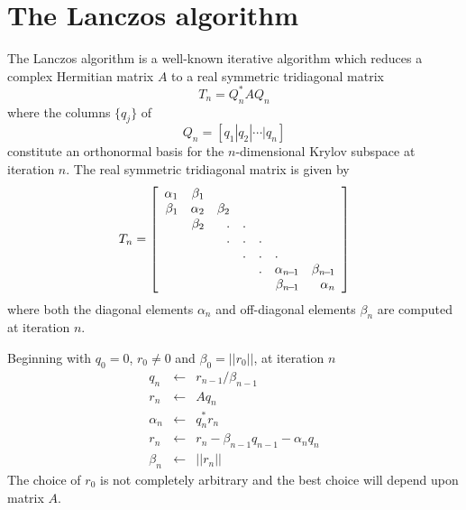 \documentclass[twoside,12pt]{article}
\begin{document}
\section{The Lanczos algorithm}\label{sec:alg}
The Lanczos algorithm is a well-known iterative algorithm
which reduces a complex Hermitian matrix $A$
to a real symmetric tridiagonal matrix
\begin{equation}\label{basic_lancz}
T_{n} = Q_{n}^{*}AQ_{n}
\end{equation}
where the columns $\{q_{j}\}$ of
\begin{equation}
Q_{n} = \left[q_{1}|q_{2}|\cdots|q_{n}\right]
\end{equation}
constitute an orthonormal basis for the $n$-dimensional Krylov subspace 
at iteration $n$.
The real symmetric tridiagonal matrix is given by
\begin{equation}
T_{n} = \left[
\begin{array}{rrrrrrr}
\alpha_{1}&\beta_{1} &   &   &   &   &   \\
 \beta_{1}&\alpha_{2} &\beta_{2} &   &   &   &   \\
&\beta_{2} & . & . &   &   &   \\
   &   & . & . & . &   &   \\
   &   &   & . & . &\multicolumn{1}{l}{.} &   \\
   &   &   &   & . &\alpha_{n\!-\!1}&\beta_{n\!-\!1} \\
   &   &   &   &   &\beta_{n\!-\!1} &\alpha_{n}
\end{array}
\right]
\end{equation}
where both the diagonal elements $\alpha_{n}$
and off-diagonal elements $\beta_{n}$ are computed at iteration $n$.

Beginning with $q_{0} = 0$, $r_{0} \neq 0$ and $\beta_{0} = ||r_{0}||$,
at iteration $n$
\begin{eqnarray} \label{lancz_alg}
     q_{n} &\leftarrow& r_{n\!-\!1}/\beta_{n\!-\!1}	\nonumber	\\
     r_{n} &\leftarrow& Aq_{n}				\nonumber	\\
\alpha_{n} &\leftarrow& q_{n}^{*}r_{n}			\nonumber	\\
     r_{n} &\leftarrow& r_{n} - \beta_{n\!-\!1}q_{n\!-\!1} - \alpha_{n}q_{n}
							\nonumber	\\
 \beta_{n} &\leftarrow& ||r_{n}||
\end{eqnarray}
The choice of $r_{0}$ is not completely arbitrary and
the best choice will depend upon matrix $A$.
\end{document}
